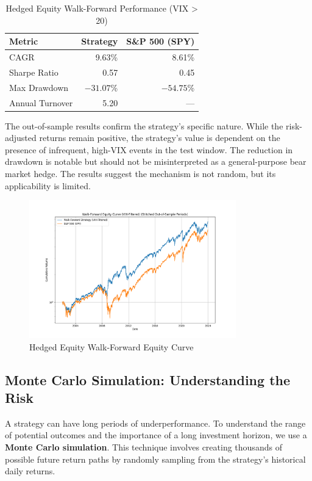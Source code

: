 \documentclass{article}
\begin{document}
\begin{table}[htbp]
\centering
\caption{Hedged Equity Walk-Forward Performance (VIX > 20)}
\begin{tabular}{lrr}
\toprule
\textbf{Metric} & \textbf{Strategy} & \textbf{S\&P 500 (SPY)} \\
\midrule
CAGR           & 9.63\%    & 8.61\%         \\
Sharpe Ratio   & 0.57      & 0.45           \\
Max Drawdown   & $-31.07$\% & $-54.75$\%      \\
Annual Turnover & 5.20      & ---            \\
\bottomrule
\end{tabular}
\end{table}

The out-of-sample results confirm the strategy's specific nature. While the risk-adjusted returns remain positive, the strategy's value is dependent on the presence of infrequent, high-VIX events in the test window. The reduction in drawdown is notable but should not be misinterpreted as a general-purpose bear market hedge. The results suggest the mechanism is not random, but its applicability is limited.

\begin{figure}[htbp]
\centering
\includegraphics[width=0.8\textwidth]{plots/plot_walk_forward_vix_filtered.png}
\caption{Hedged Equity Walk-Forward Equity Curve}
\label{fig:walk_forward_vix}
\end{figure}

\subsection{Monte Carlo Simulation: Understanding the Risk}
A strategy can have long periods of underperformance. To understand the range of potential outcomes and the importance of a long investment horizon, we use a \textbf{Monte Carlo simulation}. This technique involves creating thousands of possible future return paths by randomly sampling from the strategy's historical daily returns.
\end{document}
